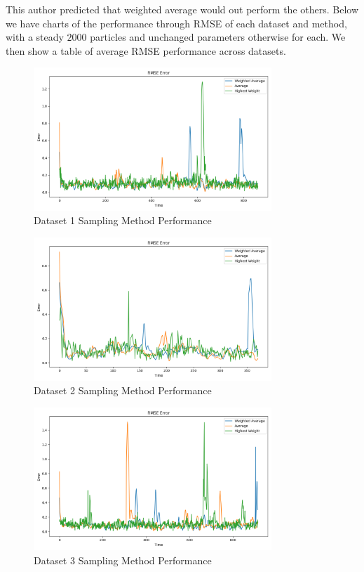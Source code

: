 \documentclass{article}
\begin{document}
This author predicted that weighted average would out perform the others. Below we have charts of the performance through RMSE of each dataset and method, with a steady $2000$ particles and unchanged parameters otherwise for each. We then show a table of average RMSE performance across datasets.

\begin{figure}[H]
    \centering
    \includegraphics[width=0.8\textwidth]{./imgs/task2/studentdata1_rmse_methods.png}
    \caption{Dataset 1 Sampling Method Performance}
\end{figure}

\begin{figure}[H]
    \centering
    \includegraphics[width=0.8\textwidth]{./imgs/task2/studentdata2_rmse_methods.png}
    \caption{Dataset 2 Sampling Method Performance}
\end{figure}

\begin{figure}[H]
    \centering
    \includegraphics[width=0.8\textwidth]{./imgs/task2/studentdata3_rmse_methods.png}
    \caption{Dataset 3 Sampling Method Performance}
\end{figure}
\end{document}
